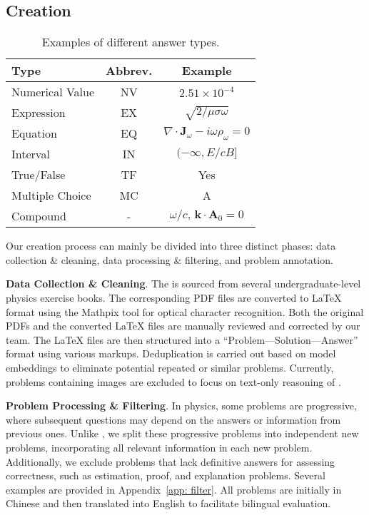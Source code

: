 \subsection{{\benchmark} Creation}\label{sec: creation}

\begin{table}[t]
    \centering
    \footnotesize
    \caption{Examples of different answer types.}
    \begin{tabular}{lcc}
\toprule
\textbf{Type} & \textbf{Abbrev.}    & \textbf{Example}                         \\ \hline
Numerical Value & NV & $2.51 \times 10^{-4}$                             \\
Expression & EX & $\sqrt{2/\mu\sigma\omega}$                \\
Equation  & EQ & $\nabla\cdot\boldsymbol{J}_{\omega}-i\omega\rho_{\omega}=0$   \\
Interval & IN & $(-\infty,E/cB]$             \\ 
True/False & TF & Yes \\
Multiple Choice & MC & A \\
Compound & - & $\omega/c,\, \boldsymbol{k}\cdot\boldsymbol{A}_{0}=0$\\
\bottomrule
\end{tabular}
\label{tab:examples of answer types}
\end{table}

Our {\benchmark} creation process can mainly be divided into three distinct phases: data collection \& cleaning, data processing \& filtering, and problem annotation.

\textbf{Data Collection \& Cleaning}.
The {\benchmark} is sourced from several undergraduate-level physics exercise books. 
The corresponding PDF files are converted to LaTeX format using the Mathpix tool for optical character recognition. 
Both the original PDFs and the converted LaTeX files are manually reviewed and corrected by our team. 
The LaTeX files are then structured into a ``Problem—Solution—Answer'' format using various markups. 
Deduplication is carried out based on model embeddings to eliminate potential repeated or similar problems. 
Currently, problems containing images are excluded to focus on text-only reasoning of {\benchmark}.

\textbf{Problem Processing \& Filtering}.
In physics, some problems are progressive, where subsequent questions may depend on the answers or information from previous ones. 
Unlike \citet{OlympiadBench2024He, OlympicArena2024huang}, we split these progressive problems into independent new problems, incorporating all relevant information in each new problem. 
Additionally, we exclude problems that lack definitive answers for assessing correctness, such as estimation, proof, and explanation problems. 
Several examples are provided in Appendix~\ref{app: filter}. 
All problems are initially in Chinese and then translated into English to facilitate bilingual evaluation.



